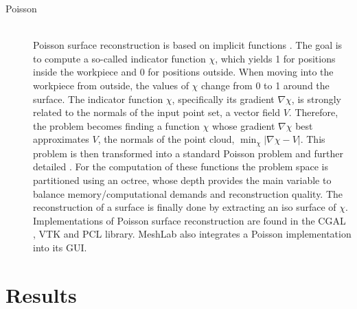 \begin{description}
	\item[Poisson] \hfill \\
	Poisson surface reconstruction is based on implicit functions \cite{poisson}.
	The goal is to compute a so-called indicator function $\chi$, which yields 1 for positions inside the workpiece and 0 for positions outside.
	When moving into the workpiece from outside, the values of $\chi$ change from 0 to 1 around the surface.
	The indicator function $\chi$, specifically its gradient $\nabla\chi$, is strongly related to the normals of the input point set, a vector field $V$.
	Therefore, the problem becomes finding a function $\chi$ whose gradient $\nabla\chi$ best approximates $V$, the normals of the point cloud, \ie $\min_\chi |\nabla\chi - V|$.
	This problem is then transformed into a standard Poisson problem and further detailed \cite{poisson}.
	For the computation of these functions the problem space is partitioned using an octree, whose depth provides the main variable to balance memory/computational demands and reconstruction quality.
	The reconstruction of a surface is finally done by extracting an iso surface of $\chi$.
	Implementations of Poisson surface reconstruction are found in \eg the CGAL \cite{cgal_poisson}, VTK \cite{vtk_poisson} and PCL \cite{pcl} library.
	MeshLab also integrates a Poisson implementation into its GUI.
\end{description}

\section{Results}
\label{sec:point_cloud_results}



